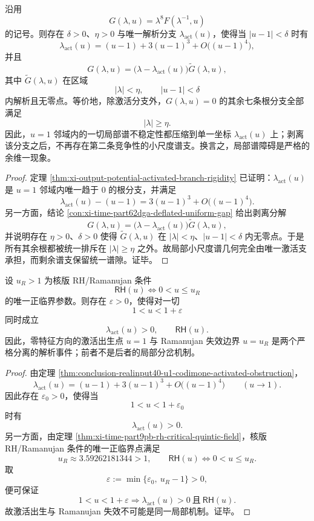 \begin{theorem}[\texorpdfstring{$u=1$}{u=1} 邻域局部谱障碍的余维一性]\label{thm:conclusion-realinput40-u1-codimone-activated-obstruction}
沿用
\[
G(\lambda,u)=\lambda^8F(\lambda^{-1},u)
\]
的记号。则存在 \(\delta>0\)、\(\eta>0\) 与唯一解析分支 \(\lambda_{\mathrm{act}}(u)\)，使得当 \(|u-1|<\delta\) 时有
\[
\lambda_{\mathrm{act}}(u)
=(u-1)+3(u-1)^3+O\!\bigl((u-1)^4\bigr),
\]
并且
\[
G(\lambda,u)
=
\bigl(\lambda-\lambda_{\mathrm{act}}(u)\bigr)\widetilde G(\lambda,u),
\]
其中 \(\widetilde G(\lambda,u)\) 在区域
\[
|\lambda|<\eta,\qquad |u-1|<\delta
\]
内解析且无零点。等价地，除激活分支外，\(G(\lambda,u)=0\) 的其余七条根分支全部满足
\[
|\lambda|\ge \eta.
\]
因此，\(u=1\) 邻域内的一切局部谱不稳定性都压缩到单一坐标 \(\lambda_{\mathrm{act}}(u)\) 上；剥离该分支之后，不再存在第二条竞争性的小尺度谱支。换言之，局部谱障碍是严格的余维一现象。
\end{theorem}
\begin{proof}
定理 \ref{thm:xi-output-potential-activated-branch-rigidity} 已证明：\(\lambda_{\mathrm{act}}(u)\) 是 \(u=1\) 邻域内唯一趋于 \(0\) 的根分支，并满足
\[
\lambda_{\mathrm{act}}(u)-(u-1)=3(u-1)^3+O\!\bigl((u-1)^4\bigr).
\]
另一方面，结论 \ref{con:xi-time-part62dga-deflated-uniform-gap} 给出剥离分解
\[
G(\lambda,u)
=
\bigl(\lambda-\lambda_{\mathrm{act}}(u)\bigr)\widetilde G(\lambda,u),
\]
并说明存在 \(\eta>0\)、\(\delta>0\) 使得 \(\widetilde G(\lambda,u)\) 在 \(|\lambda|<\eta\)、\(|u-1|<\delta\) 内无零点。于是所有其余根都被统一排斥在 \(|\lambda|\ge \eta\) 之外。故局部小尺度谱几何完全由唯一激活支承担，而剩余谱支保留统一谱隙。证毕。
\end{proof}

\begin{theorem}\label{thm:conclusion-realinput40-activated-branch-rh-separation}
设 \(u_R>1\) 为核版 RH/Ramanujan 条件
\[
\textsf{RH}(u)\Longleftrightarrow 0<u\le u_R
\]
的唯一正临界参数。则存在 \(\varepsilon>0\)，使得对一切
\[
1<u<1+\varepsilon
\]
同时成立
\[
\lambda_{\mathrm{act}}(u)>0,
\qquad
\textsf{RH}(u).
\]
因此，零特征方向的激活出生点 \(u=1\) 与 Ramanujan 失效边界 \(u=u_R\) 是两个严格分离的解析事件；前者不是后者的局部分岔机制。
\end{theorem}
\begin{proof}
由定理 \ref{thm:conclusion-realinput40-u1-codimone-activated-obstruction}，
\[
\lambda_{\mathrm{act}}(u)
=(u-1)+3(u-1)^3+O\!\bigl((u-1)^4\bigr)
\qquad (u\to 1).
\]
因此存在 \(\varepsilon_0>0\)，使得当
\[
1<u<1+\varepsilon_0
\]
时有
\[
\lambda_{\mathrm{act}}(u)>0.
\]
另一方面，由定理 \ref{thm:xi-time-part9pb-rh-critical-quintic-field}，核版 RH/Ramanujan 条件的唯一正临界点满足
\[
u_R\approx 3.59262181344>1,
\qquad
\textsf{RH}(u)\Longleftrightarrow 0<u\le u_R.
\]
取
\[
\varepsilon:=\min\{\varepsilon_0,\ u_R-1\}>0,
\]
便可保证
\[
1<u<1+\varepsilon
\Longrightarrow
\lambda_{\mathrm{act}}(u)>0
\ \text{且}\
\textsf{RH}(u).
\]
故激活出生与 Ramanujan 失效不可能是同一局部机制。证毕。
\end{proof}

